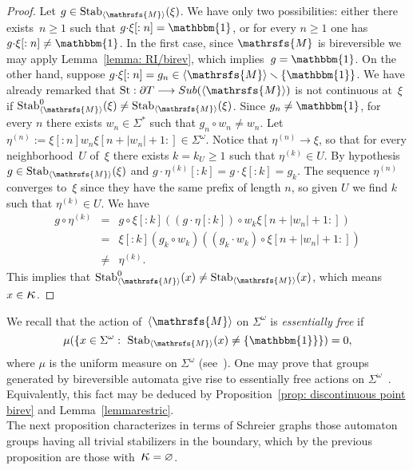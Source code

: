 \documentclass{amsart}
\begin{document}
\begin{proof}
Let $g\in \operatorname{Stab}_{{{\langle}{{\mathrsfs{{{M}}}}}{\rangle}}}(\xi)$. We have only two possibilities: either there
exists~$n\geq 1$ such that $g{{{\cdot}}} \xi[:n]=\operatorname{\mathbbm{1}}$, or for every $n\geq 1$
one has $g{{{\cdot}}} \xi[:n]\neq \operatorname{\mathbbm{1}} $. In the first case, since
${{{\mathrsfs{{M}}}}}$ is bireversible we may apply Lemma~\ref{lemma: RI/birev}, which implies~$g= \operatorname{\mathbbm{1}}$. On the other hand, suppose $g{{{\cdot}}} \xi[:n]=g_n\in {{{\langle}{{\mathrsfs{{{M}}}}}{\rangle}}}\smallsetminus \{\operatorname{\mathbbm{1}}\}$. We have already remarked that $\operatorname{St} : \partial T \longrightarrow Sub ({{{\langle}{{\mathrsfs{{{M}}}}}{\rangle}}})$ is not continuous at~$\xi$ if $\operatorname{Stab}_{{{\langle}{{\mathrsfs{{{M}}}}}{\rangle}}}^{0}(\xi) \neq
\operatorname{Stab}_{{{\langle}{{\mathrsfs{{{M}}}}}{\rangle}}}(\xi)$. Since $g_{n}\neq \operatorname{\mathbbm{1}}$, for every $n$ there exists
$w_n\in {{{\Sigma}}}^{\ast}$ such that $g_n{{{\circ}}} w_n\neq w_n$. Let
$\eta^{(n)}:=\xi[:n]w_n \xi[n+|w_{n}|+1:] \in
{{{\Sigma}}}^{\omega}$. Notice that $\eta^{(n)}\rightarrow \xi$, so that for
every neighborhood~$U$ of~$\xi$ there exists $k=k_U\geq 1$ such that
$\eta^{(k)}\in U$. By hypothesis $g\in \operatorname{Stab}_{{{\langle}{{\mathrsfs{{{M}}}}}{\rangle}}}(\xi)$ and
$g{{{\cdot}}}\eta^{(k)}[:k]=g{{{\cdot}}} \xi[:k]=g_k$. The sequence $\eta^{(n)}$ converges to~$\xi$ since they have the same prefix of length $n$,  so given $U$ we find $k$ such that $\eta^{(k)}\in U$. We have
\begin{eqnarray*}
g{{{\circ}}} \eta^{(k)}&=&g{{{\circ}}}  \xi[:k]\left((g{{{\cdot}}}\eta[:k]){{{\circ}}} w_k \xi[n+|w_{n}|+1:]\right)\\
&=&\xi[:k](g_k{{{\circ}}} w_k)\left((g_k{{{\cdot}}} w_k){{{\circ}}} \xi[n+|w_{n}|+1:] \right)\\
&\neq&  \eta^{(k)}.
\end{eqnarray*}
This implies that $\operatorname{Stab}_{{{\langle}{{\mathrsfs{{{M}}}}}{\rangle}}}^{0}(x) \neq
\operatorname{Stab}_{{{\langle}{{\mathrsfs{{{M}}}}}{\rangle}}}(x)$, which means $x \in {\hbox{\Large{$\kappa$}}}$.
\end{proof}
We recall that the action of~${{{\langle}{{\mathrsfs{{{M}}}}}{\rangle}}}$ on ${{{\Sigma}}}^{\omega}$ is \emph{essentially free} if
$$
{{\mu}}(\{x\in {{{\Sigma}}}^{\omega}: \ \operatorname{Stab}_{{{\langle}{{\mathrsfs{{{M}}}}}{\rangle}}}(x)\neq \{\operatorname{\mathbbm{1}}\} \})=0,
$$
where ${{\mu}}$ is the uniform measure on ${{{\Sigma}}}^{\omega}$ (see~\cite{DynSubgroup}). One may prove that groups generated by bireversible automata give rise to essentially free actions on ${{{\Sigma}}}^{\omega}$~\cite{StVoVo2011}. Equivalently, this fact may be deduced by Proposition~\ref{prop: discontinuous point birev} and Lemma~\ref{lemmarestric}. \\
The next proposition characterizes in terms of Schreier graphs those automaton groups having all trivial stabilizers in the boundary,
which by the previous proposition are those with~${\hbox{\Large{$\kappa$}}}=\varnothing$.
\end{document}

